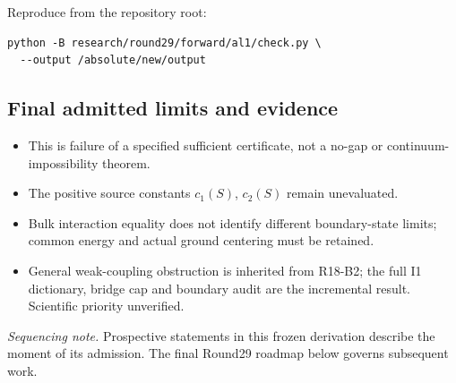 Reproduce from the repository root:
\begin{verbatim}
python -B research/round29/forward/al1/check.py \
  --output /absolute/new/output
\end{verbatim}

\subsection*{Final admitted limits and evidence}
\begin{itemize}
\item This is failure of a specified sufficient certificate, not a no-gap or continuum-impossibility theorem.
\item The positive source constants \(c_1(S)\), \(c_2(S)\) remain unevaluated.
\item Bulk interaction equality does not identify different boundary-state limits; common energy and actual ground centering must be retained.
\item General weak-coupling obstruction is inherited from R18-B2; the full I1 dictionary, bridge cap and boundary audit are the incremental result. Scientific priority unverified.
\end{itemize}
\par{}\par{}

\emph{Sequencing note.} Prospective statements in this frozen derivation describe the moment of its admission. The final Round29 roadmap below governs subsequent work.
